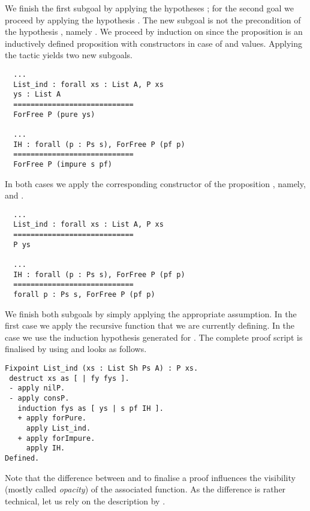 We finish the first subgoal by applying the hypotheses ; for the second goal we proceed by applying the hypothesis
.
The new subgoal is not the precondition of the hypothesis
, namely .
We proceed by induction on  since the proposition
 is an inductively defined proposition with constructors
in case of  and  values.
Applying the tactic  yields
two new subgoals.

\begin{verbatim}
  ...
  List_ind : forall xs : List A, P xs
  ys : List A
  ============================
  ForFree P (pure ys)

  ...
  IH : forall (p : Ps s), ForFree P (pf p)
  ============================
  ForFree P (impure s pf)
\end{verbatim}

In both cases we apply the corresponding constructor of the
proposition , namely,  and
.

\begin{verbatim}
  ...
  List_ind : forall xs : List A, P xs
  ============================
  P ys

  ...
  IH : forall (p : Ps s), ForFree P (pf p)
  ============================
  forall p : Ps s, ForFree P (pf p)
\end{verbatim}

We finish both subgoals by simply applying the appropriate assumption.
In the first case we apply the recursive function  that
we are currently defining.
In the  case we use the induction hypothesis generated
for .
The complete proof script is finalised by using  and
looks as follows.

\begin{verbatim}
Fixpoint List_ind (xs : List Sh Ps A) : P xs.
 destruct xs as [ | fy fys ].
 - apply nilP.
 - apply consP.
   induction fys as [ ys | s pf IH ].
   + apply forPure.
     apply List_ind.
   + apply forImpure.
     apply IH.
Defined.
\end{verbatim}

Note that the difference between  and  to
finalise a proof influences the visibility (mostly called
\emph{opacity}) of the associated function.
As the difference is rather technical, let us rely on the description
by \citet{chlipala2011certified}.

